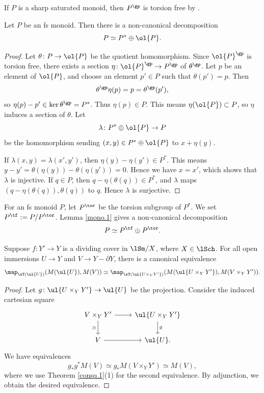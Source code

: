 \documentclass[10pt]{amsart}
\begin{document}
If $P$ is a sharp saturated monoid, then $P^{\gp}$ is torsion free by \cite[Proposition I.1.3.5(2)]{Ogu}.

\begin{lem}
\label{mono.1}
Let $P$ be an fs monoid.
Then there is a non-canonical decomposition
\[
P
\simeq
P^*\oplus \ol{P}.
\]
\end{lem}
\begin{proof}
Let $\theta\colon P\to \ol{P}$ be the quotient homomorphism.
Since $\ol{P}^{\gp}$ is torsion free, there exists a section $\eta\colon \ol{P}^\gp\to P^\gp$ of $\theta^\gp$.
Let $p$ be an element of $\ol{P}$, and choose an element $p'\in P$ such that $\theta(p')=p$.
Then
\[
\theta^\gp\eta(p)=p=\theta^\gp(p'),
\]
so $\eta(p)-p'\in \ker \theta^\gp=P^*$.
Thus $\eta(p)\in P$.
This means $\eta(\ol{P})\subset P$, so $\eta$ induces a section of $\theta$.
Let
\[
\lambda\colon P^*\oplus \ol{P}\to P
\]
be the homomorphism sending $(x,y)\in P^*\oplus \ol{P}$ to $x+\eta(y)$.

If $\lambda(x,y)=\lambda(x',y')$, then $\eta(y)-\eta(y')\in P^*$.
This means $y-y'=\theta(\eta(y))-\theta(\eta(y'))=0$.
Hence we have $x=x'$, which shows that $\lambda$ is injective.
If $q\in P$, then $q-\eta(\theta(q))\in P^*$, and $\lambda$ maps $(q-\eta(\theta(q)),\theta(q))$ to $q$.
Hence $\lambda$ is surjective.
\end{proof}

\begin{df}
For an fs monoid $P$, let $P^\tor$ be the torsion subgroup of $P^*$.
We set $P^\tf:=P/P^\tor$.
Lemma \ref{mono.1} gives a non-canonical decomposition
\begin{equation}
P
\simeq
P^\tf \oplus P^\tor.
\end{equation}
\end{df}


\begin{lem}
\label{lemma.10}
Suppose $f\colon Y'\to Y$ is a dividing cover in $\lSm/X$, where $X\in \lSch$.
For all open immersions $U\to Y$ and $V\to Y-\partial Y$, there is a canonical equivalence
\[
\map_{\sT(\ul{U})}
(M(\ul{U}),M(V))
\simeq
\map_{\sT(\ul{U\times_Y Y'})}
(M(\ul{U\times_Y Y'}),M(V\times_Y Y')).
\]
\end{lem}
\begin{proof}
Let $g\colon \ul{U\times_Y Y'}\to \ul{U}$ be the projection.
Consider the induced cartesian square
\[
\begin{tikzcd}
V\times_Y Y'\ar[d,"\simeq"']\ar[r]&
\ul{U\times_Y Y'}\ar[d,"g"]
\\
V\ar[r]&
\ul{U}.
\end{tikzcd}
\]
We have equivalences
\[
g_*g^*M(V)
\simeq
g_*M(V\times_Y Y')
\simeq
M(V),
\]
where we use Theorem \ref{consq.1}(1) for the second equivalence.
By adjunction, we obtain the desired equivalence.
\end{proof}
\end{document}
